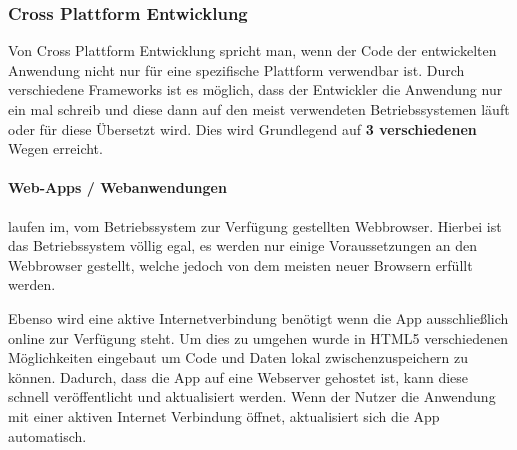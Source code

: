 \subsubsection{Cross Plattform Entwicklung}
Von Cross Plattform Entwicklung spricht man, wenn der Code der entwickelten Anwendung nicht nur für eine spezifische Plattform verwendbar ist. Durch verschiedene Frameworks ist es möglich, dass der Entwickler die Anwendung nur ein mal schreib und diese dann auf den meist verwendeten Betriebssystemen läuft oder für diese Übersetzt wird. Dies wird Grundlegend auf \textbf{3 verschiedenen} Wegen erreicht.

\paragraph{Web-Apps / Webanwendungen}laufen im, vom Betriebssystem zur Verfügung gestellten Webbrowser. Hierbei ist das Betriebssystem völlig egal, es werden nur einige Voraussetzungen an den Webbrowser gestellt, welche jedoch von dem meisten neuer Browsern erfüllt werden.

Ebenso wird eine aktive Internetverbindung benötigt wenn die App ausschließlich online zur Verfügung steht. Um dies zu umgehen wurde in HTML5 verschiedenen Möglichkeiten eingebaut um Code und Daten lokal zwischenzuspeichern zu können. Dadurch, dass die App auf eine Webserver gehostet ist, kann diese schnell veröffentlicht und aktualisiert werden. Wenn der Nutzer die Anwendung mit einer aktiven Internet Verbindung öffnet, aktualisiert sich die App automatisch. 

